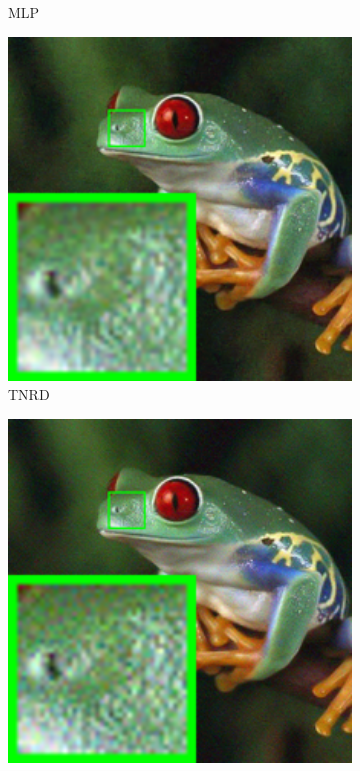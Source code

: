 \begin{figure}
\begin{subfigure}[t]{0.19\textwidth}
\caption{MLP}
    \end{subfigure}
    \hfill
    \begin{subfigure}[t]{0.19\textwidth}
        \centering
        \includegraphics[width=1\textwidth]{images/mcwnnm/nc/resize_br_TNRD_frog.png}
\caption{TNRD}
    \end{subfigure}
    \hfill
    \begin{subfigure}[t]{0.19\textwidth}
        \centering
        \includegraphics[width=1\textwidth]{images/mcwnnm/nc/resize_br_NI_frog.png}

\end{subfigure}
\end{figure}
